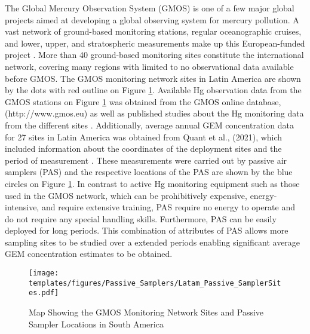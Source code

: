 \begin{flushleft}
 The Global Mercury Observation System (GMOS) is one of a few major global projects aimed at developing a global observing system for mercury pollution. A vast network of ground-based monitoring stations, regular oceanographic cruises, and lower, upper, and stratospheric measurements make up this European-funded project \cite{sprovieri_atmospheric_2016,koenig_seasonal_2021}. More than 40 ground-based monitoring sites constitute the international network, covering many regions with limited to no observational data available before GMOS\cite{sprovieri_atmospheric_2016}. The GMOS monitoring network sites in Latin America are shown by the dots with red outline on Figure \ref{fig:GMOS_PAS_stations_map}. Available Hg observation data from the GMOS stations on Figure  \ref{fig:GMOS_PAS_stations_map} was obtained from the GMOS online database,(http://www.gmos.eu) as well as published studies about the Hg monitoring data from the different sites \cite{koenig_seasonal_2021}. Additionally, average annual GEM concentration data for 27 sites in Latin America was obtained from Quant et al., (2021), which included information about the coordinates of the deployment sites and the period of measurement \cite{quant_measuring_2021}. These measurements were carried out by passive air samplers (PAS)  and the respective locations of the PAS are shown by the blue circles on Figure \ref{fig:GMOS_PAS_stations_map}. In contrast to active Hg monitoring equipment such as those used in the GMOS network, which can be prohibitively expensive, energy-intensive, and require extensive training, PAS require no energy to operate and do not require any special handling skills. Furthermore, PAS can be easily deployed for long periods. This combination of attributes of PAS allows more sampling sites to be studied over a extended periods enabling significant average GEM concentration estimates to be obtained. 
\end{flushleft}


\begin{figure}[H]
 \centering
  \texttt{[image: templates/figures/Passive\_Samplers/Latam\_Passive\_SamplerSites.pdf]}
  \caption{Map Showing the GMOS Monitoring Network Sites and Passive Sampler Locations in South America \cite{quant_measuring_2021,koenig_seasonal_2021}}
  \label{fig:GMOS_PAS_stations_map}
 
  
\end{figure}
\FloatBarrier

